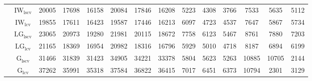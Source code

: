 \begin{table}[!ht]
{\begin{tabular}{@{}cc|ccc|ccc|ccc|ccc@{}}
 & $\mathrm{IW}_{\mathrm{lscv}}$ & \cellcolor{black!10}20005 & \cellcolor{black!10}17698 & \cellcolor{black!30}16158 & \cellcolor{black!10}20084 & \cellcolor{black!10}17846 & \cellcolor{black!30}16208 & 5223 & 4308 & 3766 & 7533 & 5635 & 5112 \\ 
 & $\mathrm{IW}_{\mathrm{lcv}}$ & \cellcolor{black!30}19855 & \cellcolor{black!30}17611 & \cellcolor{black!10}16423 & \cellcolor{black!30}19587 & \cellcolor{black!30}17446 & \cellcolor{black!10}16213 & 6097 & 4723 & 4537 & 7647 & 5867 & 5734 \\ 
 & $\mathrm{LG}_{\mathrm{lscv}}$ & 23065 & 20973 & 19280 & 21981 & 20115 & 18672 & 7758 & 6123 & 5467 & 8761 & 7880 & 7203 \\ 
 & $\mathrm{LG}_{\mathrm{lcv}}$ & 21165 & 18369 & 16954 & 20982 & 18316 & 16796 & 5929 & 5010 & 4718 & 8187 & 6894 & 6199 \\ 
 & $\mathrm{G}_{\mathrm{lscv}}$ & 31466 & 31839 & 31423 & 34905 & 34221 & 33378 & 5804 & 5623 & 5263 & 10885 & 10705 & \cellcolor{black!30}2144 \\ 
 & $\mathrm{G}_{\mathrm{lcv}}$ & 37262 & 35991 & 35318 & 37584 & 36822 & 36415 & 7017 & 6451 & 6373 & 10794 & \cellcolor{black!30}2301 & \cellcolor{black!10}3129 \\ 
\bottomrule
\end{tabular}}
\end{table}
